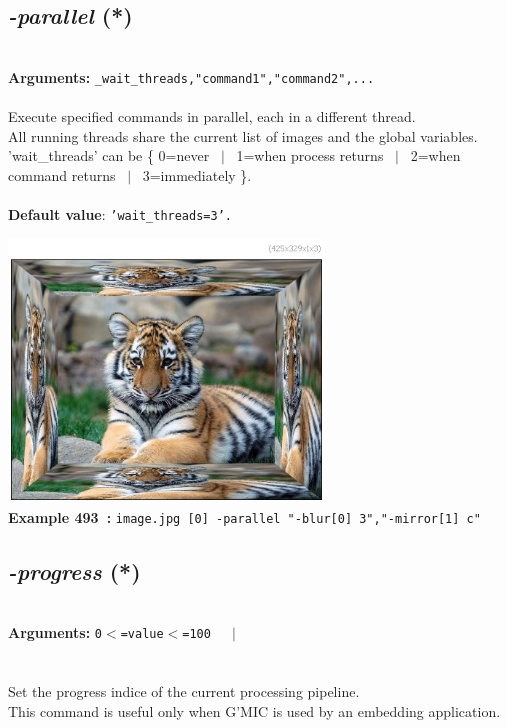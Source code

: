 \documentclass[a4paper,11pt,twoside]{book}
\begin{document}
\subsection{\emph{-parallel} (*)}\vspace*{-0.5em}
~\\\textbf{Arguments: } 
{\small \texttt{\_wait\_threads,"command1","command2",...}}\\~\\
Execute specified commands in parallel, each in a different thread.
~\\All running threads share the current list of images and the global variables.
~\\'wait\_threads' can be \{ 0=never ~$|$~ 1=when process returns ~$|$~ 2=when command returns ~$|$~ 3=immediately \}.
~\\~\\\textbf{Default value}: {\small \texttt{'wait\_threads=3'.}}
\begin{center}\includegraphics[keepaspectratio=true,height=7cm,width=\textwidth]{img/gmic_def493.jpg}\\
{\footnotesize \textbf{Example 493~:} \texttt{image.jpg [0] -parallel "-blur[0] 3","-mirror[1] c"}}
\end{center}

\subsection{\emph{-progress} (*)}\vspace*{-0.5em}
~\\\textbf{Arguments: } 
{\small \texttt{0$<$=value$<$=100}}~~~$|$\\
\\~\\
Set the progress indice of the current processing pipeline.
~\\This command is useful only when G'MIC is used by an embedding application.
\end{document}
